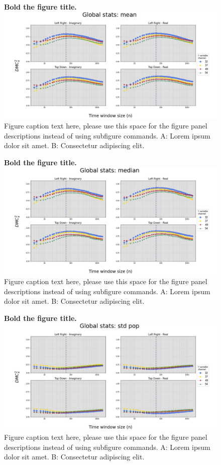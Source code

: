 \documentclass[10pt,letterpaper]{article}
\begin{document}
  \begin{figure}[!h]
    \caption{{\bf Bold the figure title.}
    \includegraphics[width=.9\textwidth]{../output/figs/global/mean.jpg}
      Figure caption text here, please use this space for the figure panel descriptions instead of using subfigure commands. A: Lorem ipsum dolor sit amet. B: Consectetur adipiscing elit.}
      \label{glob_mean}
      \end{figure}


  \begin{figure}[!h]
    \caption{{\bf Bold the figure title.}
    \includegraphics[width=.9\textwidth]{../output/figs/global/median.jpg}
      Figure caption text here, please use this space for the figure panel descriptions instead of using subfigure commands. A: Lorem ipsum dolor sit amet. B: Consectetur adipiscing elit.}
    \label{glob_median}
    \end{figure}


  \begin{figure}[!h]
    \caption{{\bf Bold the figure title.}
    \includegraphics[width=.9\textwidth]{../output/figs/global/std pop.jpg}
    Figure caption text here, please use this space for the figure panel descriptions instead of using subfigure commands. A: Lorem ipsum dolor sit amet. B: Consectetur adipiscing elit.}
    \label{glob_std_pop}
    \end{figure}
\end{document}
